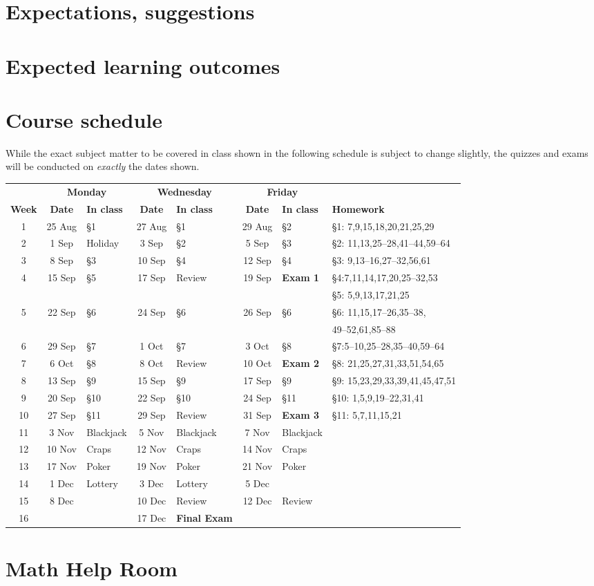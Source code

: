\documentclass[11pt]{article}
\begin{document}
\section{Expectations, suggestions}
\section{Expected learning outcomes}
\section{Course schedule}\label{Schedule} While the exact subject
matter to be covered in class shown in the following schedule is
subject to change slightly, the quizzes and exams will be conducted
on {\em exactly} the dates shown.

\begin{tabular}{c|cl|cl|cl|l}
&\multicolumn{2}{c|}{\bf Monday}
&\multicolumn{2}{c|}{\bf Wednesday}
&\multicolumn{2}{c}{\bf Friday}\\
{\bf Week}&{\bf Date}&{\bf In class}
&{\bf Date}&{\bf In class}&{\bf Date}&{\bf In class}&{\bf Homework}\\\hline
1&25 Aug&\S1&27 Aug&\S1&29 Aug&\S2&\S1: 7,9,15,18,20,21,25,29\\
2&1 Sep&Holiday&3 Sep&\S2&5 Sep&\S3&\S2: 11,13,25--28,41--44,59--64\\
3&8 Sep&\S3&10 Sep&\S4&12 Sep&\S4&\S3: 9,13--16,27--32,56,61\\
4&15 Sep&\S5&17 Sep&Review&19 Sep&{\bf Exam 1}&\S4:7,11,14,17,20,25--32,53\\
&&&&&&&\S5: 5,9,13,17,21,25\\
5&22 Sep&\S6&24 Sep&\S6&26 Sep&\S6&\S6: 11,15,17--26,35--38,\\
&&&&&&&49--52,61,85--88\\
6&29 Sep&\S7&1 Oct&\S7&3 Oct&\S8&\S7:5--10,25--28,35--40,59--64\\
7&6 Oct&\S8&8 Oct&Review&10 Oct&{\bf Exam 2}&\S8: 21,25,27,31,33,51,54,65\\
8&13 Sep&\S9&15 Sep&\S9&17 Sep&\S9&\S9: 15,23,29,33,39,41,45,47,51\\
9&20 Sep&\S10&22 Sep&\S10&24 Sep&\S11&\S10: 1,5,9,19--22,31,41\\
10&27 Sep&\S11&29 Sep&Review&31 Sep&{\bf Exam 3}&\S11: 5,7,11,15,21\\
11&3 Nov&Blackjack&5 Nov&Blackjack&7 Nov&Blackjack\\
12&10 Nov&Craps&12 Nov&Craps&14 Nov&Craps\\
13&17 Nov&Poker&19 Nov&Poker&21 Nov&Poker\\
14&1 Dec&Lottery&3 Dec&Lottery&5 Dec&&\\
15&8 Dec&&10 Dec&Review&12 Dec&Review\\
16&&&17 Dec&{\bf Final Exam}&&
\end{tabular}

\section{Math Help Room}\label{MathCenter}
\end{document}
